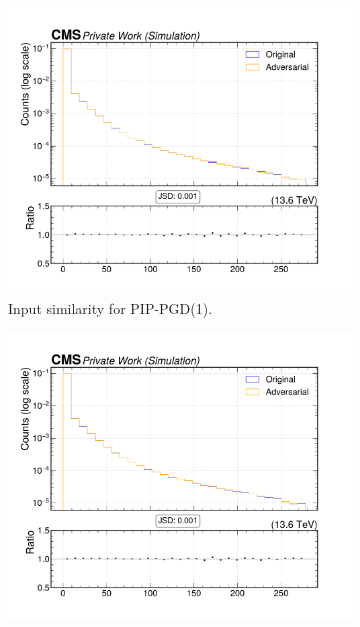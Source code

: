 \begin{figure}[htbp]
  \centering
  \begin{subfigure}[t]{0.32\textwidth}
    \includegraphics[width=\linewidth]{media/output/features/compare/combined_it_1/cmp_vtx_arr_sv_pt.pdf}
    \caption*{Input similarity for PIP-PGD(1).}
  \end{subfigure}\hfill
  \begin{subfigure}[t]{0.32\textwidth}
    \includegraphics[width=\linewidth]{media/output/features/compare/combined_it_2/cmp_vtx_arr_sv_pt.pdf}

\end{subfigure}
\end{figure}
